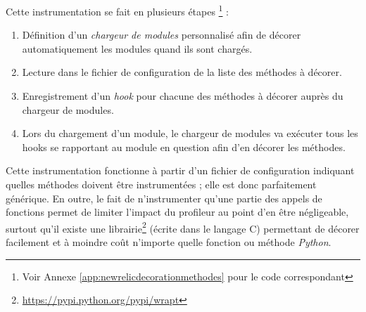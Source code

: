 Cette instrumentation se fait en plusieurs étapes \footnote{Voir Annexe \vref{app:newrelicdecorationmethodes} pour le code correspondant} :
\begin{enumerate}
  \item Définition d'un \emph{\gls{chargeur de modules}} personnalisé afin de décorer automatiquement les modules quand ils sont chargés.
  \item Lecture dans le fichier de configuration de la liste des méthodes à décorer.
  \item Enregistrement d'un \emph{\gls{hook}} pour chacune des méthodes à décorer auprès du chargeur de modules.
  \item Lors du chargement d'un module, le chargeur de modules va exécuter tous les hooks se rapportant au module en question afin d'en décorer les méthodes.
\end{enumerate}

Cette instrumentation fonctionne à partir d'un fichier de configuration indiquant quelles méthodes doivent être instrumentées ; elle est donc parfaitement générique. En outre, le fait de n'instrumenter qu'une partie des appels de fonctions permet de limiter l'impact du profileur au point d'en être négligeable, surtout qu'il existe une librairie\footnote{\url{https://pypi.python.org/pypi/wrapt}} (écrite dans le langage C) permettant de décorer facilement et à moindre coût n'importe quelle fonction ou méthode \emph{Python}.
